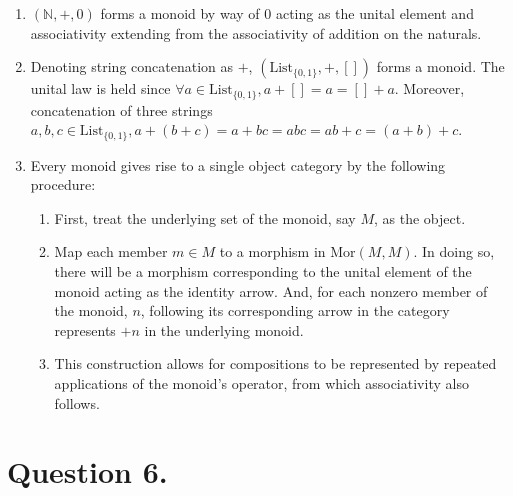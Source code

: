 \documentclass{article}
\begin{document}
\begin{enumerate}[label=(\alph*)]

\item $(\mathbb{N}, +, 0)$ forms a monoid by way of $0$ acting as the unital element and associativity extending from the associativity of addition on the naturals.

\item Denoting string concatenation as $+$, $(\textrm{List}_{\{0, 1\}}, +, [])$ forms a monoid. The unital law is held since $\forall a \in \textrm{List}_{\{0, 1\}}, a + [] = a = [] + a$. Moreover, concatenation of three strings $a, b, c \in \textrm{List}_{\{0, 1\}}, a + (b + c) = a + bc = abc = ab + c = (a  + b) + c$.

\item Every monoid gives rise to a single object category by the following procedure:
    \begin{enumerate}[label=-]
        \item First, treat the underlying set of the monoid, say $M$, as the object.
        \item Map each member $m \in M$ to a morphism in $\textrm{Mor}(M, M)$. In doing so, there will be a morphism corresponding to the unital element of the monoid acting as the identity arrow. And, for each nonzero member of the monoid, $n$, following its corresponding arrow in the category represents $+ n$ in the underlying monoid.
        \item This construction allows for compositions to be represented by repeated applications of the monoid’s operator, from which associativity also follows. 
    \end{enumerate}

\end{enumerate}

\section*{Question 6.}
\end{document}
